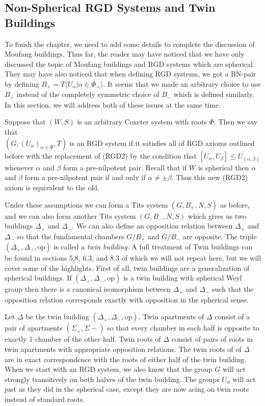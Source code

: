 \documentclass[class=book, crop=false,12 pt]{standalone}
\begin{document}
\subsection{Non-Spherical RGD Systems and Twin Buildings}
To finish the chapter, we need to add some details to complete the discussion of Moufang buildings. Thus far, the reader may have noticed that we have only discussed the topic of Moufang buildings and RGD systems which are spherical. They may have also noticed that when defining RGD systems, we got a BN-pair by defining $B_+=T\langle U_\alpha|\alpha\in \Phi_+\rangle.$ It seems that we made an arbitrary choice to use $B_+$ instead of the completely symmetric choice of $B_-$ which is defined similarly. In this section, we will address both of these issues at the same time.

Suppose that $(W,S)$ is an arbitrary Coxeter system with roots $\Phi.$ Then we say that \\$(G,(U_\alpha)_{\alpha\in \Phi},T)$ is an RGD system if it satisfies all of RGD axioms outlined before with the replacement of (RGD2) by the condition that $[U_\alpha,U_\beta]\le U_{(\alpha,\beta)}$ whenever $\alpha$ and $\beta$ form a pre-nilpotent pair. Recall that if $W$ is spherical then $\alpha$ and $\beta$ form a pre-nilpotent pair if and only if $\alpha\neq \pm \beta.$ Thus this new (RGD2) axiom is equivalent to the old. 

Under these assumptions we can form a Tits system $(G,B_+,N,S)$ as before, and we can also form another Tits system $(G,B_-,N,S)$ which gives us two buildings $\Delta_+$ and $\Delta_-.$ We can also define an opposition relation between $\Delta_+$ and $\Delta_-$ so that the fundamental chambers $G/B_+$ and $G/B_-$ are opposite. The triple $(\Delta_+,\Delta_-,\mathrm{op})$ is called a \emph{twin building}. A full treatment of Twin buildings can be found in sections 5.8, 6.3, and 8.3 of \cite{buildings} which we will not repeat here, but we will cover some of the highlights. First of all, twin buildings are a generalization of spherical buildings. If $(\Delta_+,\Delta_-,\mathrm{op})$ is a twin building with spherical Weyl group then there is a canonical isomorphism between $\Delta_+$ and $\Delta_-$ such that the opposition relation corresponds exactly with opposition in the spherical sense.

Let $\Delta$ be the twin building $(\Delta_+,\Delta_-,\mathrm{op}).$ Twin apartments of $\Delta$ consist of a pair of apartments $(\Sigma_+,\Sigma-)$ so that every chamber in each half is opposite to exactly 1 chamber of the other half. Twin roots of $\Delta$ consist of pairs of roots in twin apartments with appropriate opposition relations. The twin roots of of $\Delta$ are in exact correspondence with the roots of either half of the twin building. When we start with an RGD system, we also know that the group $G$ will act strongly transitively on both halves of the twin building. The groups $U_\alpha$ will act just as they did in the spherical case, except they are now acing on twin roots instead of standard roots.
\end{document}
